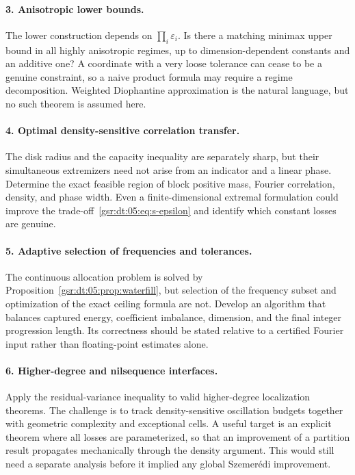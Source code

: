 \documentclass[11pt,letterpaper]{article}
\numberwithin{equation}{section}
\theoremstyle{definition}
\theoremstyle{remark}
\newcommand{\1}{\mathbf 1}
\newcommand{\eps}{\varepsilon}
\begin{document}
\paragraph{3. Anisotropic lower bounds.}
The lower construction depends on $\prod_i\eps_i$. Is there a matching minimax upper bound in all highly anisotropic regimes, up to dimension-dependent constants and an additive one? A coordinate with a very loose tolerance can cease to be a genuine constraint, so a naive product formula may require a regime decomposition. Weighted Diophantine approximation is the natural language, but no such theorem is assumed here.

\paragraph{4. Optimal density-sensitive correlation transfer.}
The disk radius and the capacity inequality are separately sharp, but their simultaneous extremizers need not arise from an indicator and a linear phase. Determine the exact feasible region of block positive mass, Fourier correlation, density, and phase width. Even a finite-dimensional extremal formulation could improve the trade-off~\eqref{gsr:dt:05:eq:s-epsilon} and identify which constant losses are genuine.

\paragraph{5. Adaptive selection of frequencies and tolerances.}
The continuous allocation problem is solved by Proposition~\ref{gsr:dt:05:prop:waterfill}, but selection of the frequency subset and optimization of the exact ceiling formula are not. Develop an algorithm that balances captured energy, coefficient imbalance, dimension, and the final integer progression length. Its correctness should be stated relative to a certified Fourier input rather than floating-point estimates alone.

\paragraph{6. Higher-degree and nilsequence interfaces.}
Apply the residual-variance inequality to valid higher-degree localization theorems. The challenge is to track density-sensitive oscillation budgets together with geometric complexity and exceptional cells. A useful target is an explicit theorem where all losses are parameterized, so that an improvement of a partition result propagates mechanically through the density argument. This would still need a separate analysis before it implied any global Szemer\'edi improvement.
\end{document}

